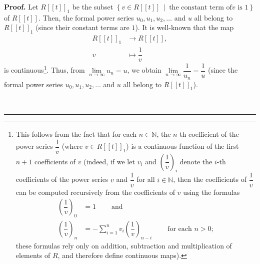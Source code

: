 \documentclass[numbers=enddot,12pt,final,onecolumn,notitlepage]{scrartcl}%
\theoremstyle{definition}
\newenvironment{proof}[1][Proof]{\noindent\textbf{#1.} }{\ \rule{0.5em}{0.5em}}
\let\sumnonlimits\sum
\renewcommand{\sum}{\sumnonlimits\limits}
\newenvironment{verlong}{}{}
\begin{document}
\begin{verlong}
\begin{proof}
Let $R\left[  \left[  t\right]  \right]  _{1}$ be the subset $\left\{  v\in
R\left[  \left[  t\right]  \right]  \ \mid\ \text{the constant term of
}v\text{ is }1\right\}  $ of $R\left[  \left[  t\right]  \right]  $. Then, the
formal power series $u_{0},u_{1},u_{2},\ldots$ and $u$ all belong to $R\left[
\left[  t\right]  \right]  _{1}$ (since their constant terms are $1$). It is
well-known that the map%
\begin{align*}
R\left[  \left[  t\right]  \right]  _{1}  &  \rightarrow R\left[  \left[
t\right]  \right]  ,\\
v  &  \mapsto\dfrac{1}{v}%
\end{align*}
is continuous\footnote{This follows from the fact that for each $n\in
\mathbb{N}$, the $n$-th coefficient of the power series $\dfrac{1}{v}$ (where
$v\in R\left[  \left[  t\right]  \right]  _{1}$) is a continuous function of
the first $n+1$ coefficients of $v$ (indeed, if we let $v_{i}$ and $\left(
\dfrac{1}{v}\right)  _{i}$ denote the $i$-th coefficients of the power series
$v$ and $\dfrac{1}{v}$ for all $i\in\mathbb{N}$, then the coefficients of
$\dfrac{1}{v}$ can be computed recursively from the coefficients of $v$ using
the formulas%
\begin{align*}
\left(  \dfrac{1}{v}\right)  _{0}  &  =1\ \ \ \ \ \ \ \ \ \ \text{and}\\
\left(  \dfrac{1}{v}\right)  _{n}  &  =-\sum_{i=1}^{n}v_{i}\left(  \dfrac
{1}{v}\right)  _{n-i}\ \ \ \ \ \ \ \ \ \ \text{for each }n>0;
\end{align*}
these formulas rely only on addition, subtraction and multiplication of
elements of $R$, and therefore define continuous maps).}. Thus, from
$\lim\limits_{n\rightarrow\infty}u_{n}=u$, we obtain $\lim
\limits_{n\rightarrow\infty}\dfrac{1}{u_{n}}=\dfrac{1}{u}$ (since the formal
power series $u_{0},u_{1},u_{2},\ldots$ and $u$ all belong to $R\left[
\left[  t\right]  \right]  _{1}$).


\end{proof}
\end{verlong}
\end{document}
